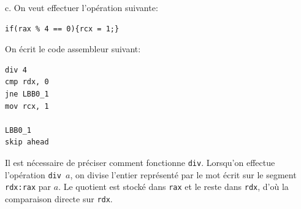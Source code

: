 \documentclass[11pt, a4 paper]{article}
\begin{document}
c. On veut effectuer l'opération suivante:
\begin{lstlisting}[style=CStyle]
if(rax % 4 == 0){rcx = 1;}
\end{lstlisting}

On écrit le code assembleur suivant:
\begin{lstlisting}[style=customasm]
div 4
cmp rdx, 0
jne LBB0_1
mov rcx, 1

LBB0_1
skip ahead
\end{lstlisting}
Il est nécessaire de préciser comment fonctionne \texttt{div}. Lorsqu'on effectue l'opération \texttt{div $a$}, on divise l'entier représenté par le mot écrit sur le segment \texttt{rdx:rax} par $a$. Le quotient est stocké dans \texttt{rax} et le reste dans \texttt{rdx}, d'où la comparaison directe sur \texttt{rdx}.
\end{document}
